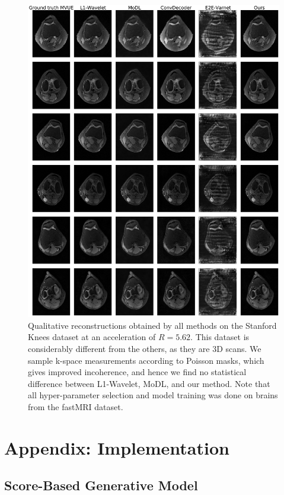 \documentclass{article}
\begin{document}
\begin{figure}
    \centering
    \includegraphics[width=\columnwidth]{stanford_knee-poisson-5.62-mvue-comp.pdf}
    \caption{Qualitative reconstructions obtained by all methods on the Stanford Knees dataset at an acceleration of $R=5.62$. This dataset is considerably different from the others, as they are 3D scans. We sample k-space measurements according to Poisson masks, which gives improved incoherence, and hence we find no statistical difference between L1-Wavelet, MoDL, and our method. Note that all hyper-parameter selection and model training was done on brains from the fastMRI dataset.}
    \label{fig:stanford-recons-5.62}
\end{figure}


\section{Appendix: Implementation}\label{app:implementation}

\subsection{Score-Based Generative Model}
\end{document}
